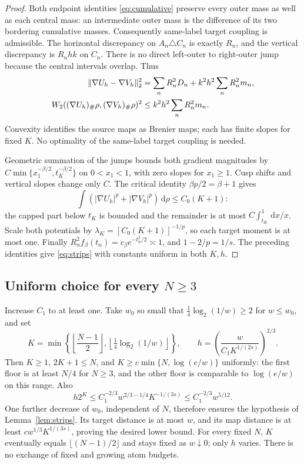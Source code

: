 \documentclass[11pt]{article}
\theoremstyle{remark}\newtheorem{remark}[theorem]{Remark}
\newcommand{\dd}{\,\mathrm d}\newcommand{\Ptwo}{\mathcal P_2}
\begin{document}
\begin{proof}
Both endpoint identities \eqref{eq:cumulative} preserve every outer mass as well as each central mass: an intermediate outer mass is the difference of its two bordering cumulative masses. Consequently same-label target coupling is admissible. The horizontal discrepancy on $A_n\triangle C_n$ is exactly $R_n$, and the vertical discrepancy is $R_nhk$ on $C_n$. There is no direct left-outer to right-outer jump because the central intervals overlap. Thus
\begin{align*}
 \lVert\nabla U_h-\nabla V_h\rVert_2^2
   &=\sum_nR_n^2D_n+k^2h^2\sum_nR_n^2m_n,\\
 W_2((\nabla U_h)_\#\rho,(\nabla V_h)_\#\rho)^2
   &\le k^2h^2\sum_nR_n^2m_n.
\end{align*}
Convexity identifies the source maps as Brenier maps; each has finite slopes for fixed $K$. No optimality of the same-label target coupling is needed.

Geometric summation of the jumps bounds both gradient magnitudes by
$C\min\{x_1^{-\beta/2},t_K^{-\beta/2}\}$ on $0<x_1<1$, with zero slopes for $x_1\ge1$. Cusp shifts and vertical slopes change only $C$. The critical identity $\beta p/2=\beta+1$ gives
\[
 \int(|\nabla U_h|^p+|\nabla V_h|^p)\dd\rho\le C_0(K+1):
\]
the capped part below $t_K$ is bounded and the remainder is at most
$C\int_{t_K}^1\dd x/x$. Scale both potentials by
$\lambda_K=[C_0(K+1)]^{-1/p}$, so each target moment is at most one.
Finally $R_n^2 f_\beta(t_n)=c_\beta e^{-t_n^2/2}\asymp1$, and $1-2/p=1/s$. The preceding identities give \eqref{eq:strips} with constants uniform in both $K,h$.
\end{proof}

\subsection{Uniform choice for every \texorpdfstring{$N\ge3$}{N >= 3}}
Increase $C_1$ to at least one. Take $w_0$ so small that
$\frac14\log_2(1/w)\ge2$ for $w\le w_0$, and set
\[
 K=\min\left\{\left\lfloor\frac{N-1}{2}\right\rfloor,
                  \left\lfloor\tfrac14\log_2(1/w)\right\rfloor\right\},
 \qquad h=\left(\frac{w}{C_1K^{1/(2s)}}\right)^{2/3}.
\]
Then $K\ge1$, $2K+1\le N$, and
$K\ge c\min\{N,\log(e/w)\}$ uniformly: the first floor is at least $N/4$ for $N\ge3$, and the other floor is comparable to $\log(e/w)$ on this range. Also
\[
 h2^K\le C_1^{-2/3}w^{2/3-1/4}K^{-1/(3s)}
           \le C_1^{-2/3}w^{5/12}.
\]
One further decrease of $w_0$, independent of $N$, therefore ensures the hypothesis of Lemma~\ref{lem:strips}. Its target distance is at most $w$, and its map distance is at least
$c w^{1/3}K^{1/(3s)}$, proving the desired lower bound. For every fixed $N$, $K$ eventually equals $\lfloor(N-1)/2\rfloor$ and stays fixed as $w\downarrow0$; only $h$ varies. There is no exchange of fixed and growing atom budgets.
\end{document}
